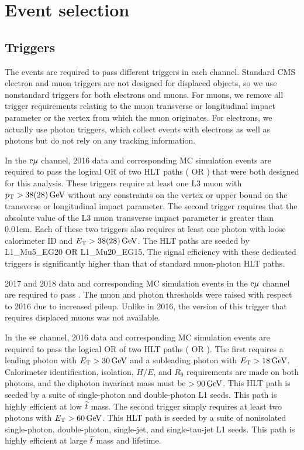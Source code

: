 \section{Event selection}
\label{selection}

\subsection{Triggers}
The events are required to pass different triggers in each channel. Standard CMS electron and muon triggers are not designed for displaced objects, so we use nonstandard triggers for both electrons and muons. For muons, we remove all trigger requirements relating to the muon transverse or longitudinal impact parameter or the vertex from which the muon originates. For electrons, we actually use photon triggers, which collect events with electrons as well as photons but do not rely on any tracking information.

In the $\mathrm{e}{\mu}$ channel, 2016 data and corresponding MC simulation events are required to pass the logical OR of two HLT paths ( OR ) that were both designed for this analysis. These triggers require at least one L3 muon with $p_{\mathrm{T}}>38(28)\,\text{Ge\hspace{-.08em}V}$ without any constraints on the vertex or upper bound on the transverse or longitudinal impact parameter. The second trigger requires that the absolute value of the L3 muon transverse impact parameter is greater than 0.01\unit{cm}. Each of these two triggers also requires at least one photon with loose calorimeter ID and $E_{\mathrm{T}}>38(28)\,\text{Ge\hspace{-.08em}V}$. The HLT paths are seeded by L1\_Mu5\_EG20 OR L1\_Mu20\_EG15. The signal efficiency with these dedicated triggers is significantly higher than that of standard muon-photon HLT paths.

2017 and 2018 data and corresponding MC simulation events in the $\mathrm{e}{\mu}$ channel are required to pass . The muon \pt and photon \ET thresholds were raised with respect to 2016 due to increased pileup. Unlike in 2016, the version of this trigger that requires displaced muons was not available.

In the $\mathrm{e}\mathrm{e}$ channel, 2016 data and corresponding MC simulation events are required to pass the logical OR of two HLT paths ( OR  ). The first requires a leading photon with $E_{\mathrm{T}}>30\,\text{Ge\hspace{-.08em}V}$ and a subleading photon with $E_{\mathrm{T}}>18\,\text{Ge\hspace{-.08em}V}$. Calorimeter identification, isolation, $H/E$, and $R_9$ requirements are made on both photons, and the diphoton invariant mass must be $>90\,\text{Ge\hspace{-.08em}V}$. This HLT path is seeded by a suite of single-photon and double-photon L1 seeds. This path is highly efficient at low $\widetilde{t}$ mass. The second trigger simply requires at least two photons with $E_{\mathrm{T}}>60\,\text{Ge\hspace{-.08em}V}$. This HLT path is seeded by a suite of nonisolated single-photon, double-photon, single-jet, and single-tau-jet L1 seeds. This path is highly efficient at large $\widetilde{t}$ mass and lifetime.

